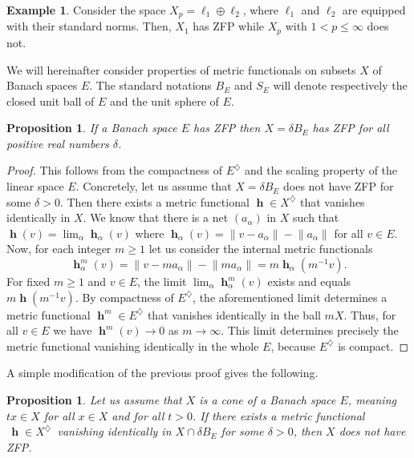 \documentclass[a4paper,12pt]{article}
\newtheorem{proposition}[theorem]{Proposition}
\theoremstyle{definition}
\newtheorem{example}[theorem]{Example}
\numberwithin{equation}{section}
\newcommand{\norm}[1]{\lVert#1\rVert} %
\numberwithin{equation}{section}
\DeclareMathOperator{\h}{\mathbf{h}} %
\begin{document}
\begin{example}  
Consider the space 
$X_p = \ell_1 \oplus \ell_2$, where $\ell_1$ 
and $\ell_2$ are equipped with their standard 
norms. Then, $X_1$ has ZFP while $X_p$ with 
$1 < p \leq \infty$ does not.
\end{example}

We will hereinafter consider properties
of metric functionals on subsets $X$ of 
Banach spaces $E$. The standard notations
$B_E$ and $S_E$ will denote respectively the 
closed unit ball of $E$ and the unit sphere 
of $E$.

\begin{proposition}
If a Banach space $E$ has ZFP then 
$X=\delta B_E$ has ZFP for all positive
real numbers $\delta$.
\end{proposition} 
 
\begin{proof}  
This follows from the compactness of 
$E^\diamondsuit$ and the scaling property of 
the linear space $E$. 
Concretely, let us assume that 
$X=\delta B_E$ does not have ZFP for some 
$\delta >0$. Then there exists a metric 
functional $\h\in X^\diamondsuit$ that 
vanishes identically in $X$. We know that 
there is a net $(a_\alpha)$ in $X$ such 
that $\h(v)=\lim_\alpha \h_\alpha(v)$ where
$\h_\alpha(v) = \norm{v-a_\alpha}
-\norm{a_\alpha}$ for all $v\in E$.  
Now, for each integer $m\geq 1$ let us 
consider the internal metric functionals 
$$
\h_\alpha^{m}(v) = \norm{v- m a_\alpha} 
    - \norm{m a_\alpha} 
    = m \h_\alpha(m^{-1} v).
$$
For fixed $m\geq 1$ and $v\in E$, the 
limit $\lim_{\alpha} \h_\alpha^{m}(v)$ exists
and equals $m\h(m^{-1} v)$. By compactness of
$E^\diamondsuit$, the aforementioned limit 
determines a metric functional 
$\h^m\in E^\diamondsuit$ that vanishes 
identically in the ball $mX$. Thus, for all
$v\in E$ we have $\h^m(v)\to 0$ as 
$m\to\infty$. This limit determines precisely 
the metric functional vanishing identically 
in the whole $E$, because $E^\diamondsuit$ is 
compact.
\end{proof}

A simple modification of the previous proof 
gives the following. 

\begin{proposition} 
Let us assume that $X$ is a cone of a 
Banach space $E$, meaning $tx \in X$ for all 
$x\in X$ and for all $t>0$. If there exists a 
metric functional $\,\h \in X^\diamondsuit\,$ 
vanishing identically in $X \cap \delta B_E$ 
for some $\delta>0$, then $X$ does not have 
ZFP.
\end{proposition}
\end{document}
